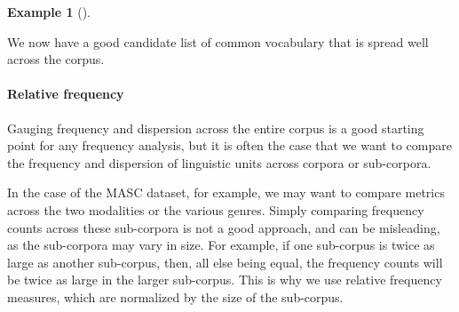 \documentclass[
  letterpaper,
  DIV=11,
  numbers=noendperiod]{scrreprt}
\let\oldparagraph\paragraph
\renewcommand{\paragraph}[1]{\oldparagraph{#1}\mbox{}}
\theoremstyle{definition}
\newtheorem{example}{Example}[chapter]
\theoremstyle{remark}
\begin{document}
\begin{example}[]
\begin{table}
\begin{minipage}{\linewidth}
{}

\end{minipage}%
\newline
\begin{minipage}{\linewidth}



\end{minipage}%

\end{table}%

\end{example}

We now have a good candidate list of common vocabulary that is spread
well across the corpus.

\paragraph{Relative frequency}\label{sec-eda-frequency-relative}

Gauging frequency and dispersion across the entire corpus is a good
starting point for any frequency analysis, but it is often the case that
we want to compare the frequency and dispersion of linguistic units
across corpora or sub-corpora.

In the case of the MASC dataset, for example, we may want to compare
metrics across the two modalities or the various genres. Simply
comparing frequency counts across these sub-corpora is not a good
approach, and can be misleading, as the sub-corpora may vary in size.
For example, if one sub-corpus is twice as large as another sub-corpus,
then, all else being equal, the frequency counts will be twice as large
in the larger sub-corpus. This is why we use relative frequency
measures, which are normalized by the size of the sub-corpus.
\end{document}
